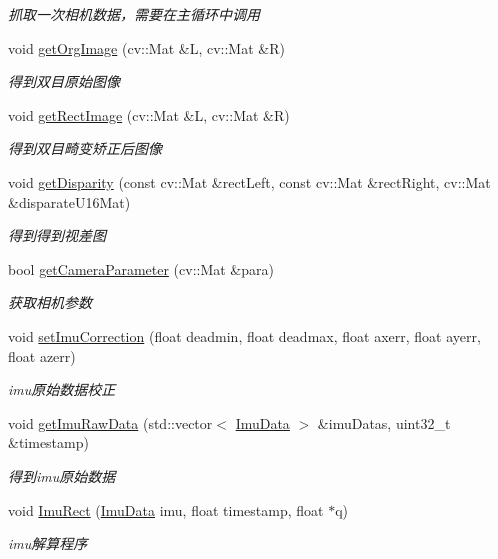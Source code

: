 \begin{DoxyCompactItemize}
\begin{DoxyCompactList}\small\item\em 抓取一次相机数据，需要在主循环中调用 \end{DoxyCompactList}\item 
void \hyperlink{classBinoCamera_a7e675afbd9b11a855b8816abe413f51b}{get\+Org\+Image} (cv\+::\+Mat \&L, cv\+::\+Mat \&R)
\begin{DoxyCompactList}\small\item\em 得到双目原始图像 \end{DoxyCompactList}\item 
void \hyperlink{classBinoCamera_a0ca8fdc7baebb847cec029094a1308d8}{get\+Rect\+Image} (cv\+::\+Mat \&L, cv\+::\+Mat \&R)
\begin{DoxyCompactList}\small\item\em 得到双目畸变矫正后图像 \end{DoxyCompactList}\item 
void \hyperlink{classBinoCamera_ac9e29c484ef2a61ce42e8c3dfa41b714}{get\+Disparity} (const cv\+::\+Mat \&rect\+Left, const cv\+::\+Mat \&rect\+Right, cv\+::\+Mat \&disparate\+U16\+Mat)
\begin{DoxyCompactList}\small\item\em 得到得到视差图 \end{DoxyCompactList}\item 
bool \hyperlink{classBinoCamera_a7dc100e891a67b59295e79b93241e16f}{get\+Camera\+Parameter} (cv\+::\+Mat \&para)
\begin{DoxyCompactList}\small\item\em 获取相机参数 \end{DoxyCompactList}\item 
void \hyperlink{classBinoCamera_a6bf7b4beec317a6e7bc8a66f3f255fd7}{set\+Imu\+Correction} (float deadmin, float deadmax, float axerr, float ayerr, float azerr)
\begin{DoxyCompactList}\small\item\em imu原始数据校正 \end{DoxyCompactList}\item 
void \hyperlink{classBinoCamera_aa8bfc29050c583efb840f391c2e94263}{get\+Imu\+Raw\+Data} (std\+::vector$<$ \hyperlink{structImuData}{Imu\+Data} $>$ \&imu\+Datas, uint32\+\_\+t \&timestamp)
\begin{DoxyCompactList}\small\item\em 得到imu原始数据 \end{DoxyCompactList}\item 
void \hyperlink{classBinoCamera_a5662fa1d861687af9577508be18ae29d}{Imu\+Rect} (\hyperlink{structImuData}{Imu\+Data} imu, float timestamp, float $\ast$q)
\begin{DoxyCompactList}\small\item\em imu解算程序 \end{DoxyCompactList}\end{DoxyCompactItemize}


